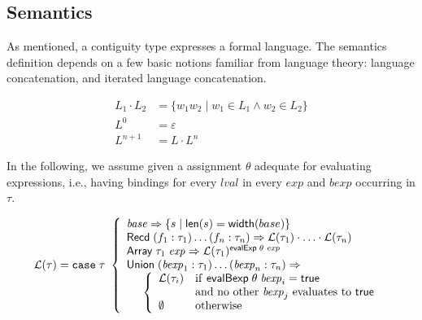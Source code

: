 \documentclass[svgnames]{llncs}
\newcommand{\ie}{i.e.}
\newcommand{\konst}[1]{\ensuremath{\mathsf{#1}}}
\newcommand{\set}[1]{\ensuremath{\{ {#1} \}}}
\newcommand{\Lang}[1]{\ensuremath{{\mathcal L}({#1})}}
\begin{document}
\subsection{Semantics}

As mentioned, a contiguity type expresses a formal language. The
semantics definition depends on a few basic notions familiar from
language theory: language concatenation, and iterated language
concatenation.

\begin{align}
L_1 \cdot L_2 &= \set{w_1 w_2 \mid w_1 \in L_1 \land w_2 \in  L_2} \\
L^0 &= \varepsilon \\
L^{n+1} &= L \cdot L^n
\end{align}


\begin{definition}

 In the following, we assume given a assignment $\theta$ adequate for
evaluating expressions, \ie, having bindings for every
$\mathit{lval}$ in every $\mathit{exp}$ and $\mathit{bexp}$
occurring in $\tau$.

\[
\Lang{\tau} =
\mathtt{case}\; \tau\
 \left\{
 \begin{array}{l}
 \mathit{base} \Rightarrow \set{s \mid \konst{len}(s) = \konst{width}(base)} \\
 \konst{Recd}\; (f_1 : \tau_1) \ldots (f_n : \tau_n)
      \Rightarrow \Lang{\tau_1} \cdot \ldots \cdot \Lang{\tau_n}
\\
 \konst{Array}\; \tau_1 \; \mathit{exp}
      \Rightarrow  \Lang{\tau_1}^{\konst{evalExp}\;\theta\;\mathit{exp}}
\\
 \konst{Union}\; (\mathit{bexp}_1 : \tau_1) \ldots (\mathit{bexp}_n : \tau_n) \Rightarrow \\
  \hspace*{5mm}
 \left\{
 \begin{array}{ll}
    \Lang{\tau_i} &  \mathrm{if}\ \konst{evalBexp}\;\theta\;\mathit{bexp}_i = \konst{true} \\
                  & \mathrm{and\ no\ other}\ \mathit{bexp}_j\ \mathrm{evaluates\ to}\ \konst{true}  \\
    \emptyset & \mathrm{otherwise}
 \end{array}
 \right.
 \\
\end{array}
 \right.
\]
\end{definition}
\end{document}
